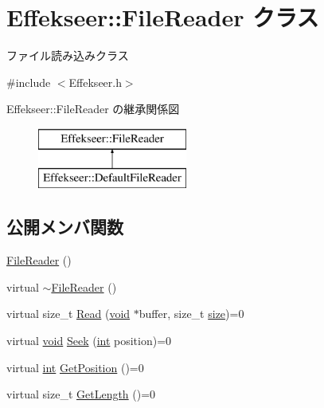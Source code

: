 \hypertarget{class_effekseer_1_1_file_reader}{}\section{Effekseer\+:\+:File\+Reader クラス}
\label{class_effekseer_1_1_file_reader}


ファイル読み込みクラス  




{\ttfamily \#include $<$Effekseer.\+h$>$}

Effekseer\+:\+:File\+Reader の継承関係図\begin{figure}[H]
\begin{center}
\leavevmode
\includegraphics[height=2.000000cm]{class_effekseer_1_1_file_reader}
\end{center}
\end{figure}
\subsection*{公開メンバ関数}
\begin{DoxyCompactItemize}
\item 
\mbox{\hyperlink{class_effekseer_1_1_file_reader_aa5ae7f1e7a6c8a8147e4f6d819b361c0}{File\+Reader}} ()
\item 
virtual \mbox{\hyperlink{class_effekseer_1_1_file_reader_a694f051a464abcda384734c3612062f2}{$\sim$\+File\+Reader}} ()
\item 
virtual size\+\_\+t \mbox{\hyperlink{class_effekseer_1_1_file_reader_a6274b775770e8ac9ba4f212c80e94be1}{Read}} (\mbox{\hyperlink{namespace_effekseer_ab34c4088e512200cf4c2716f168deb56}{void}} $\ast$buffer, size\+\_\+t \mbox{\hyperlink{namespace_effekseer_a73c68f3d33539d30844b9d1e058077f7}{size}})=0
\item 
virtual \mbox{\hyperlink{namespace_effekseer_ab34c4088e512200cf4c2716f168deb56}{void}} \mbox{\hyperlink{class_effekseer_1_1_file_reader_a5daeb98049f994bccf874b2374e36a25}{Seek}} (\mbox{\hyperlink{namespace_effekseer_ace0abf7c2e6947e519ebe8b54cbcc30a}{int}} position)=0
\item 
virtual \mbox{\hyperlink{namespace_effekseer_ace0abf7c2e6947e519ebe8b54cbcc30a}{int}} \mbox{\hyperlink{class_effekseer_1_1_file_reader_ad69aa533374ee6661938c7a81495b6d7}{Get\+Position}} ()=0
\item 
virtual size\+\_\+t \mbox{\hyperlink{class_effekseer_1_1_file_reader_ae802d02a06437baa0ed74f1927617924}{Get\+Length}} ()=0
\end{DoxyCompactItemize}



